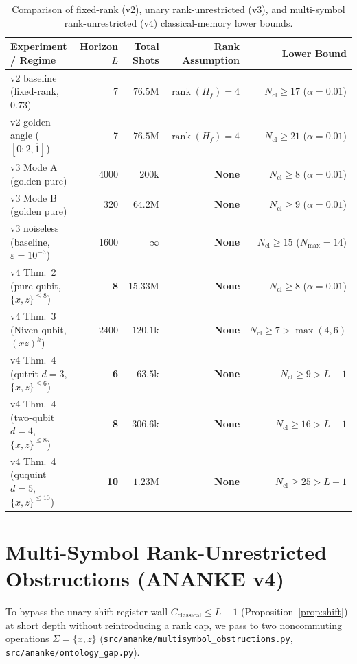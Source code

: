 \documentclass[11pt]{article}
\theoremstyle{definition}
\newcommand{\eps}{\varepsilon}
\begin{document}
\begin{table}[t]
\centering
\small
\begin{tabular}{@{}lrrrr@{}}
\toprule
Experiment / Regime & Horizon $L$ & Total Shots & Rank Assumption & Lower Bound \\
\midrule
v2 baseline (fixed-rank, $0.73$) & 7 & $76.5\text{M}$ & $\operatorname{rank}(H_f)=4$ & $N_{\mathrm{cl}}\ge 17$ ($\alpha=0.01$) \\
v2 golden angle ($[0;2,\overline{1}]$) & 7 & $76.5\text{M}$ & $\operatorname{rank}(H_f)=4$ & $N_{\mathrm{cl}}\ge 21$ ($\alpha=0.01$) \\
v3 Mode A (golden pure) & 4000 & $200\text{k}$ & \textbf{None} & \textbf{$N_{\mathrm{cl}}\ge 8$} ($\alpha=0.01$) \\
v3 Mode B (golden pure) & 320 & $64.2\text{M}$ & \textbf{None} & \textbf{$N_{\mathrm{cl}}\ge 9$} ($\alpha=0.01$) \\
v3 noiseless (baseline, $\eps=10^{-3}$) & 1600 & $\infty$ & \textbf{None} & \textbf{$N_{\mathrm{cl}}\ge 15$} ($N_{\max}=14$) \\
v4 Thm.~2 (pure qubit, $\{x,z\}^{\le 8}$) & \textbf{8} & $15.33\text{M}$ & \textbf{None} & \textbf{$N_{\mathrm{cl}}\ge 8$} ($\alpha=0.01$) \\
v4 Thm.~3 (Niven qubit, $(xz)^k$) & $2400$ & \textbf{$120.1\text{k}$} & \textbf{None} & \textbf{$N_{\mathrm{cl}}\ge 7>\max(4,6)$} \\
v4 Thm.~4 (qutrit $d=3$, $\{x,z\}^{\le 6}$) & \textbf{6} & \textbf{$63.5\text{k}$} & \textbf{None} & \textbf{$N_{\mathrm{cl}}\ge 9>L+1$} \\
v4 Thm.~4 (two-qubit $d=4$, $\{x,z\}^{\le 8}$) & \textbf{8} & \textbf{$306.6\text{k}$} & \textbf{None} & \textbf{$N_{\mathrm{cl}}\ge 16>L+1$} \\
v4 Thm.~4 (ququint $d=5$, $\{x,z\}^{\le 10}$) & \textbf{10} & $1.23\text{M}$ & \textbf{None} & \textbf{$N_{\mathrm{cl}}\ge 25>L+1$} \\
\bottomrule
\end{tabular}
\caption{Comparison of fixed-rank (v2), unary rank-unrestricted (v3), and multi-symbol rank-unrestricted (v4) classical-memory lower bounds.}
\label{tab:ananke}
\end{table}

\section{Multi-Symbol Rank-Unrestricted Obstructions (ANANKE v4)}

To bypass the unary shift-register wall $C_{\mathrm{classical}}\le L+1$ (Proposition~\ref{prop:shift}) at short depth without reintroducing a rank cap, we pass to two noncommuting operations $\Sigma=\{x,z\}$ (\texttt{src/ananke/multisymbol\_obstructions.py}, \texttt{src/ananke/ontology\_gap.py}).
\end{document}
